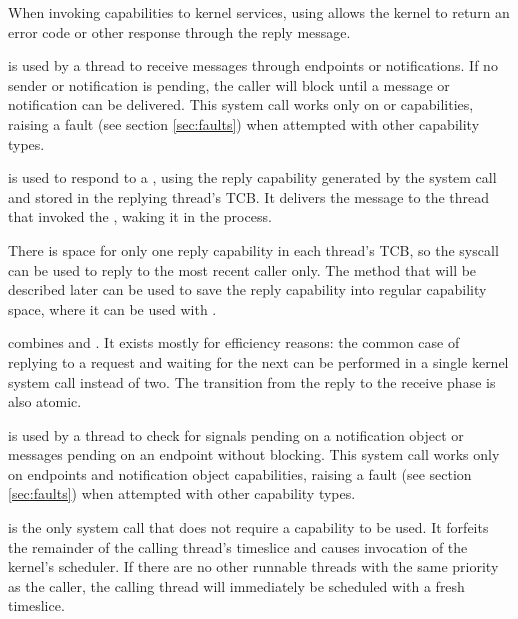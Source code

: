 \begin{description}
    When invoking capabilities to kernel services, using
     allows the kernel to return an error code
    or other response through the reply message.

    \item[\apifunc{seL4\_Recv}{sel4_recv}] is used by a thread to receive
    messages through endpoints or notifications. If no sender or
    notification is pending, the caller
    will block until a message or notification can be delivered. This system call works only on
     or  capabilities, raising a fault (see section \ref{sec:faults}) when
    attempted with other capability types.

    \item[\apifunc{seL4\_Reply}{sel4_reply}] is used to respond to a
    , using the reply capability generated by the
     system call and stored in the replying
    thread's TCB. It delivers the message to the thread that invoked
    the , waking it in
    the process.

    There is space for only one reply capability in each thread's TCB, so the
     syscall can be used to reply to the most
    recent caller only. The 
    method that will be described later can be used to save the reply
    capability into regular capability space, where it can be used with
    .

    \item[\apifunc{seL4\_ReplyRecv}{sel4_replyrecv}] combines  and
    . It exists mostly for efficiency reasons: the common case of
    replying to a request and waiting for the next can be performed in
    a single kernel system call instead of two. The transition from
    the reply to the receive phase is also atomic.

    \item[\apifunc{seL4\_NBRecv}{sel4_nbrecv}] is used by a thread to check for
    signals pending on a notification object or messages pending on an endpoint without blocking.
    This system call works only on endpoints and notification object 
    capabilities, raising a fault (see section \ref{sec:faults}) when attempted
    with other capability types.

    \item[\apifunc{seL4\_Yield}{sel4_yield}] is the only system call that does not require
    a capability to be used. It forfeits the remainder of the calling thread's
    timeslice and causes invocation of the kernel's scheduler.
    If there are no other runnable threads with the same
    priority as the caller, the calling thread will immediately be
    scheduled with a fresh timeslice.
\end{description}

